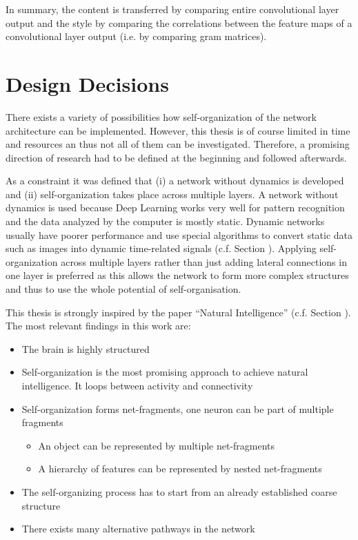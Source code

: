 In summary, the content is transferred by comparing entire convolutional layer output and the style by comparing the correlations between the feature maps of a convolutional layer output (i.e. by comparing gram matrices).

\pagebreak
\chapter{Design Decisions}
There exists a variety of possibilities how self-organization of the network architecture can be implemented.
However, this thesis is of course limited in time and resources an thus not all of them can be investigated.
Therefore, a promising direction of research had to be defined at the beginning and followed afterwards.

As a constraint it was defined that (i) a network without dynamics is developed and (ii) self-organization takes place across multiple layers.
A network without dynamics is used because Deep Learning works very well for pattern recognition and the data analyzed by the computer is mostly static.
Dynamic networks usually have poorer performance and use special algorithms to convert static data such as images into dynamic time-related signals (c.f. Section ).
Applying self-organization across multiple layers rather than just adding lateral connections in one layer is preferred as this allows the network to form more complex structures and thus to use the whole potential of self-organisation.

This thesis is strongly inspired by the paper ``Natural Intelligence''  (c.f. Section ).
The most relevant findings in this work are:
\begin{itemize}
  \item The brain is highly structured
  \item Self-organization is the most promising approach to achieve natural intelligence. It loops between activity and connectivity
  \item Self-organization forms net-fragments, one neuron can be part of multiple fragments
  \begin{itemize}
    \item An object can be represented by multiple net-fragments
    \item A hierarchy of features can be represented by nested net-fragments
\end{itemize}
  \item The self-organizing process has to start from an already established coarse structure
  \item There exists many alternative pathways in the network
\end{itemize}

